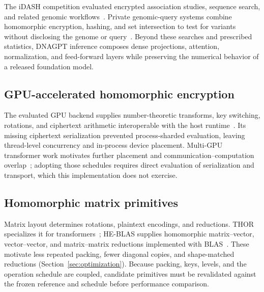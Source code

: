 The iDASH competition evaluated encrypted association studies, sequence search, and related
genomic workflows~\cite{idash2018}. Private genomic-query systems combine homomorphic encryption,
hashing, and set intersection to test for variants without disclosing the genome or
query~\cite{privategenomicqueries2017}. Beyond these searches and prescribed statistics, DNAGPT
inference composes dense projections, attention, normalization, and feed-forward layers while
preserving the numerical behavior of a released foundation model.

\subsection{GPU-accelerated homomorphic encryption}

The evaluated GPU backend supplies number-theoretic transforms, key switching, rotations, and
ciphertext arithmetic interoperable with the host runtime~\cite{gpu-ckks-backend,openfhe}.
Its missing ciphertext serialization prevented process-sharded evaluation, leaving thread-level
concurrency and in-process device placement. Multi-GPU transformer work motivates further
placement and communication--computation overlap~\cite{aegis}; adopting those schedules requires
direct evaluation of serialization and transport, which this implementation does not exercise.

\subsection{Homomorphic matrix primitives}

Matrix layout determines rotations, plaintext encodings, and reductions. THOR specializes it for
transformers~\cite{thor}; HE-BLAS supplies homomorphic matrix--vector, vector--vector, and
matrix--matrix reductions implemented with BLAS~\cite{heblas2025}. These motivate less repeated
packing, fewer diagonal copies, and shape-matched reductions (Section~\ref{sec:optimization}).
Because packing, keys, levels, and the operation schedule are coupled, candidate primitives must
be revalidated against the frozen reference and schedule before performance comparison.
